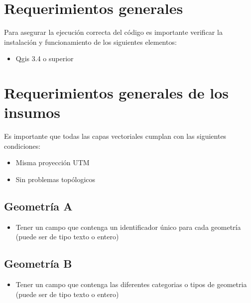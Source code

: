 \documentclass[letterpaper,10pt,spanish]{sphinxmanual}
\begin{document}
\section{Requerimientos generales}
\label{\detokenize{nivel_geometrias:requerimientos-generales}}
Para asegurar la ejecución correcta del código es importante
verificar la instalación y funcionamiento de los siguientes elementos:
\begin{itemize}
\item {} 
Qgis 3.4 o superior

\end{itemize}


\section{Requerimientos generales de los insumos}
\label{\detokenize{nivel_geometrias:requerimientos-generales-de-los-insumos}}
Es importante que todas las capas vectoriales cumplan con las siguientes condiciones:
\begin{itemize}
\item {} 
Misma proyección UTM

\item {} 
Sin problemas topólogicos

\end{itemize}


\subsection{Geometría A}
\label{\detokenize{nivel_geometrias:geometria-a}}\begin{itemize}
\item {} 
Tener un campo que contenga un identificador único para cada geometría (puede ser de tipo texto o entero)

\end{itemize}


\subsection{Geometría B}
\label{\detokenize{nivel_geometrias:geometria-b}}\begin{itemize}
\item {} 
Tener un campo que contenga las diferentes categorias o tipos de geometria (puede ser de tipo texto o entero)

\end{itemize}
\end{document}
